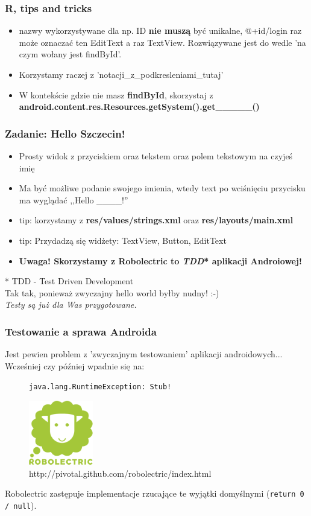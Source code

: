 \documentclass{beamer}
\begin{document}
\begin{frame}\frametitle{R, tips and tricks}
\begin{itemize}
 \item nazwy wykorzystywane dla np. ID \textbf{nie muszą} być unikalne, @+id/login raz może oznaczać ten EditText a raz TextView.
       Rozwiązywane jest do wedle 'na czym wołany jest findById'.
 \pause \item Korzystamy raczej z 'notacji\_z\_podkresleniami\_tutaj'
 \pause \item W kontekście gdzie nie masz \textbf{findById}, skorzystaj z \textbf{android.content.res.Resources.getSystem().get\_\_\_\_\_()}
\end{itemize}
\end{frame}

\begin{frame}\frametitle{Zadanie: Hello Szczecin!}
\begin{itemize}
 \item Prosty widok z przyciskiem oraz tekstem oraz polem tekstowym na czyjeś imię
 \item Ma być możliwe podanie swojego imienia, wtedy text po wciśnięciu przycisku ma wyglądać ,,Hello \_\_\_\_!''
 \item tip: korzystamy z \textbf{res/values/strings.xml} oraz \textbf{res/layouts/main.xml}
 \item tip: Przydadzą się widżety: TextView, Button, EditText
 \pause \item \textbf{Uwaga! Skorzystamy z \textbf{Robolectric} to \textit{TDD}* aplikacji Androiowej!}
\end{itemize}

* TDD - Test Driven Development\\
Tak tak, ponieważ zwyczajny hello world byłby nudny! :-)\\
\textit{Testy są już dla Was przygotowane.}
\end{frame}

\begin{frame}[fragile]\frametitle{Testowanie a sprawa Androida}
Jest pewien problem z 'zwyczajnym testowaniem' aplikacji androidowych... Wcześniej czy później wpadnie się na:
 
 \begin{figure}[ch]
  \verb|java.lang.RuntimeException: Stub!|
 \end{figure}

\begin{figure}[hc]
\includegraphics[width=0.25\textwidth]{images/robolectric}\\
\centering
http://pivotal.github.com/robolectric/index.html
\end{figure}

Robolectric zastępuje implementacje rzucające te wyjątki domyślnymi (\verb|return 0 / null|).
\end{frame}
\end{document}

